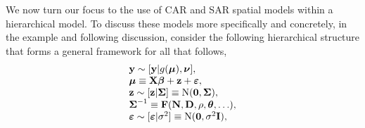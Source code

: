 \documentclass[11pt, titlepage]{article}\usepackage[]{graphicx}\usepackage[]{color}
\begin{document}
We now turn our focus to the use of CAR and SAR spatial models within a hierarchical model. To discuss these models more specifically and concretely, in the example and following discussion, consider the following hierarchical structure that forms a general framework for all that follows,
\begin{equation} \label{eq:HMsetup}
  \begin{array} {l}
    \mathbf{y} \sim [\mathbf{y}|g(\mbox{\boldmath $\mu$}),\mbox{\boldmath $\nu$}], \\
    \mbox{\boldmath $\mu$} \equiv \mathbf{X} \mbox{\boldmath $\beta$} + \mathbf{z}  + \mbox{\boldmath $\varepsilon$}, \\
		\mathbf{z} \sim \textrm{$[\mathbf{z}|\mbox{\boldmath $\Sigma$}]$} \equiv \textrm{N}(\mathbf{0},\mbox{\boldmath $\Sigma$}), \\
    \mbox{\boldmath $\Sigma$}^{-1} \equiv \mathbf{F}(\mathbf{N}, \mathbf{D},\rho,\mbox{\boldmath $\theta$},\ldots), \\
		\mbox{\boldmath $\varepsilon$} \sim \textrm{$[\mbox{\boldmath $\varepsilon$}|\sigma^2]$} \equiv \textrm{N}(\mathbf{0},\sigma^2\mathbf{I}), 
  \end{array}
\end{equation}
\end{document}
